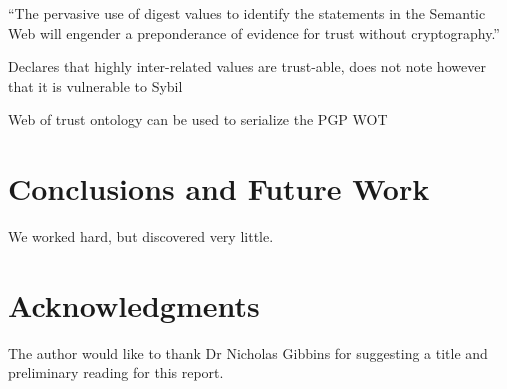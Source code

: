 \documentclass{acm_proc_article-sp}
\begin{document}
``The pervasive use of digest values to identify the statements in the Semantic Web will engender a preponderance of evidence for trust without cryptography.''

Declares that highly inter-related values are trust-able, does not note however that it is vulnerable to Sybil\cite{douceur_sybil_2002}
\cite{reagle_key_2002}

Web of trust ontology can be used to serialize the PGP WOT
\cite{_web_2004}

\section{Conclusions and Future Work}
We worked hard, but discovered very little.

\section{Acknowledgments}
The author would like to thank Dr Nicholas Gibbins for suggesting a title and preliminary reading for this report.

%


%
%
\end{document}
